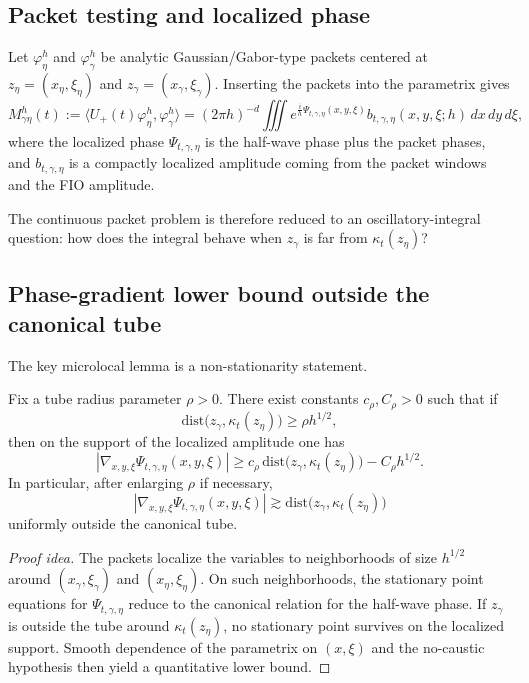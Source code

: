 \subsection{Packet testing and localized phase}

Let $\varphi_\eta^h$ and $\varphi_\gamma^h$ be analytic Gaussian/Gabor-type packets centered at $z_\eta=(x_\eta,\xi_\eta)$ and $z_\gamma=(x_\gamma,\xi_\gamma)$. Inserting the packets into the parametrix gives
\[
M_{\gamma\eta}^h(t)
:=
\langle U_+(t)\varphi_\eta^h,\varphi_\gamma^h\rangle
=
(2\pi h)^{-d}\iiint
e^{\frac{i}{h}\Psi_{t,\gamma,\eta}(x,y,\xi)}
b_{t,\gamma,\eta}(x,y,\xi;h)\,dx\,dy\,d\xi,
\]
where the localized phase $\Psi_{t,\gamma,\eta}$ is the half-wave phase plus the packet phases, and $b_{t,\gamma,\eta}$ is a compactly localized amplitude coming from the packet windows and the FIO amplitude.

The continuous packet problem is therefore reduced to an oscillatory-integral question: how does the integral behave when $z_\gamma$ is far from $\kappa_t(z_\eta)$?

\subsection{Phase-gradient lower bound outside the canonical tube}

The key microlocal lemma is a non-stationarity statement.

\begin{lemma}
\label{lem:phase-gradient}
Fix a tube radius parameter $\rho>0$. There exist constants $c_\rho,C_\rho>0$ such that if
\[
\mathrm{dist}\bigl(z_\gamma,\kappa_t(z_\eta)\bigr)\ge \rho h^{1/2},
\]
then on the support of the localized amplitude one has
\[
|\nabla_{x,y,\xi}\Psi_{t,\gamma,\eta}(x,y,\xi)|
\ge
c_\rho\,\mathrm{dist}\bigl(z_\gamma,\kappa_t(z_\eta)\bigr)
- C_\rho h^{1/2}.
\]
In particular, after enlarging $\rho$ if necessary,
\[
|\nabla_{x,y,\xi}\Psi_{t,\gamma,\eta}(x,y,\xi)|
\gtrsim
\mathrm{dist}\bigl(z_\gamma,\kappa_t(z_\eta)\bigr)
\]
uniformly outside the canonical tube.
\end{lemma}

\begin{proof}[Proof idea]
The packets localize the variables to neighborhoods of size $h^{1/2}$ around $(x_\gamma,\xi_\gamma)$ and $(x_\eta,\xi_\eta)$. On such neighborhoods, the stationary point equations for $\Psi_{t,\gamma,\eta}$ reduce to the canonical relation for the half-wave phase. If $z_\gamma$ is outside the tube around $\kappa_t(z_\eta)$, no stationary point survives on the localized support. Smooth dependence of the parametrix on $(x,\xi)$ and the no-caustic hypothesis then yield a quantitative lower bound.
\end{proof}

